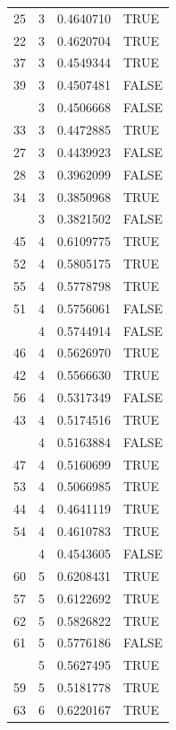 \documentclass[
]{article}
\begin{document}
\begin{longtable}[t]{lrrl}
25 & 3 & 0.4640710 & TRUE\\
22 & 3 & 0.4620704 & TRUE\\
37 & 3 & 0.4549344 & TRUE\\
39 & 3 & 0.4507481 & FALSE\\
\addlinespace
31 & 3 & 0.4506668 & FALSE\\
33 & 3 & 0.4472885 & TRUE\\
27 & 3 & 0.4439923 & FALSE\\
28 & 3 & 0.3962099 & FALSE\\
34 & 3 & 0.3850968 & TRUE\\
\addlinespace
40 & 3 & 0.3821502 & FALSE\\
45 & 4 & 0.6109775 & TRUE\\
52 & 4 & 0.5805175 & TRUE\\
55 & 4 & 0.5778798 & TRUE\\
51 & 4 & 0.5756061 & FALSE\\
\addlinespace
48 & 4 & 0.5744914 & FALSE\\
46 & 4 & 0.5626970 & TRUE\\
42 & 4 & 0.5566630 & TRUE\\
56 & 4 & 0.5317349 & FALSE\\
43 & 4 & 0.5174516 & TRUE\\
\addlinespace
49 & 4 & 0.5163884 & FALSE\\
47 & 4 & 0.5160699 & TRUE\\
53 & 4 & 0.5066985 & TRUE\\
44 & 4 & 0.4641119 & TRUE\\
54 & 4 & 0.4610783 & TRUE\\
\addlinespace
50 & 4 & 0.4543605 & FALSE\\
60 & 5 & 0.6208431 & TRUE\\
57 & 5 & 0.6122692 & TRUE\\
62 & 5 & 0.5826822 & TRUE\\
61 & 5 & 0.5776186 & FALSE\\
\addlinespace
58 & 5 & 0.5627495 & TRUE\\
59 & 5 & 0.5181778 & TRUE\\
63 & 6 & 0.6220167 & TRUE\\
\bottomrule
\end{longtable}
\endgroup{}
\end{document}

